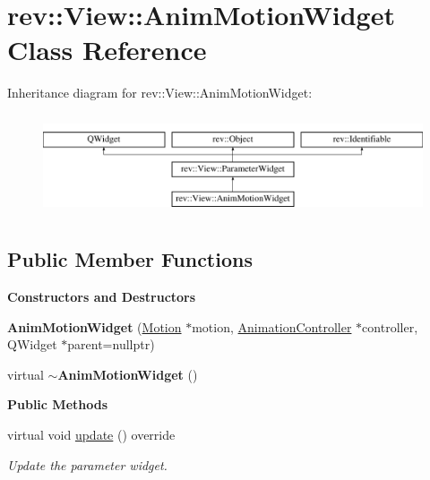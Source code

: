 \hypertarget{classrev_1_1_view_1_1_anim_motion_widget}{}\section{rev\+::View\+::Anim\+Motion\+Widget Class Reference}
\label{classrev_1_1_view_1_1_anim_motion_widget}
Inheritance diagram for rev\+::View\+::Anim\+Motion\+Widget\+:\begin{figure}[H]
\begin{center}
\leavevmode
\includegraphics[height=3.000000cm]{classrev_1_1_view_1_1_anim_motion_widget}
\end{center}
\end{figure}
\subsection*{Public Member Functions}
\begin{Indent}\textbf{ Constructors and Destructors}\par
\begin{DoxyCompactItemize}
\item 
\mbox{\label{classrev_1_1_view_1_1_anim_motion_widget_ad6e0fe0ed0eb0acdc768f70ef751376c}} 
{\bfseries Anim\+Motion\+Widget} (\mbox{\hyperlink{classrev_1_1_motion}{Motion}} $\ast$motion, \mbox{\hyperlink{classrev_1_1_animation_controller}{Animation\+Controller}} $\ast$controller, Q\+Widget $\ast$parent=nullptr)
\item 
\mbox{\label{classrev_1_1_view_1_1_anim_motion_widget_a0b4c89ba8095fad791a3705a9497d1f7}} 
virtual {\bfseries $\sim$\+Anim\+Motion\+Widget} ()
\end{DoxyCompactItemize}
\end{Indent}
\begin{Indent}\textbf{ Public Methods}\par
\begin{DoxyCompactItemize}
\item 
\mbox{\label{classrev_1_1_view_1_1_anim_motion_widget_a0d17d0d86b48fb42daa7ed8961b8d9bb}} 
virtual void \mbox{\hyperlink{classrev_1_1_view_1_1_anim_motion_widget_a0d17d0d86b48fb42daa7ed8961b8d9bb}{update}} () override
\begin{DoxyCompactList}\small\item\em Update the parameter widget. \end{DoxyCompactList}\end{DoxyCompactItemize}
\end{Indent}
